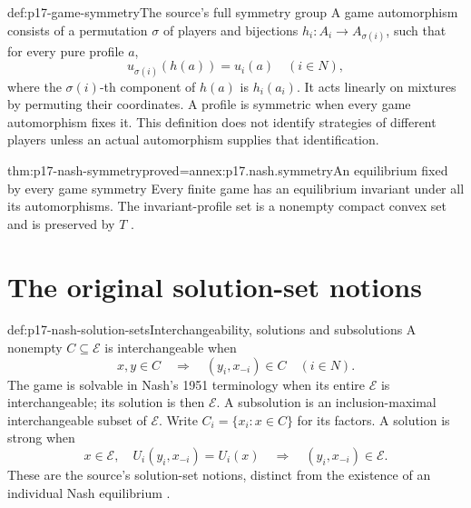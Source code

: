 \begin{hbdefinition}{def:p17-game-symmetry}{The source's full symmetry group}
A game automorphism consists of a permutation \(\sigma\) of
players and bijections \(h_i:A_i\to A_{\sigma(i)}\), such that
for every pure profile \(a\),
\[
                     u_{\sigma(i)}(h(a))=u_i(a)\quad(i\in N),
\]
where the \(\sigma(i)\)-th component of \(h(a)\) is \(h_i(a_i)\).
It acts linearly on mixtures by permuting their coordinates.
A profile is symmetric when every game automorphism fixes it.
This definition does not identify strategies of different players
unless an actual automorphism supplies that identification.
\end{hbdefinition}

\begin{hbtheorem}{thm:p17-nash-symmetry}{proved=annex:p17.nash.symmetry}{An equilibrium fixed by every game symmetry}
Every finite game has an equilibrium invariant under all its
automorphisms. The invariant-profile set is a nonempty compact
convex set and is preserved by \(T\)
\cite[p.~289, theorem~2]{Nash1951NonCooperative}.
\end{hbtheorem}

\section{The original solution-set notions}

\begin{hbdefinition}{def:p17-nash-solution-sets}{Interchangeability, solutions and subsolutions}
A nonempty \(C\subseteq\mathcal E\) is interchangeable when
\[
          x,y\in C\quad\Longrightarrow\quad(y_i,x_{-i})\in C
                                                    \quad(i\in N).
\]
The game is solvable in Nash's 1951 terminology when its entire
\(\mathcal E\) is interchangeable; its solution is then
\(\mathcal E\). A subsolution is an inclusion-maximal interchangeable
subset of \(\mathcal E\). Write \(C_i=\{x_i:x\in C\}\) for its factors.
A solution is strong when
\[
 x\in\mathcal E,\quad U_i(y_i,x_{-i})=U_i(x)
                      \quad\Longrightarrow\quad(y_i,x_{-i})\in\mathcal E.
\]
These are the source's solution-set notions, distinct from the
existence of an individual Nash equilibrium
\cite[pp.~290--291]{Nash1951NonCooperative}.
\end{hbdefinition}

